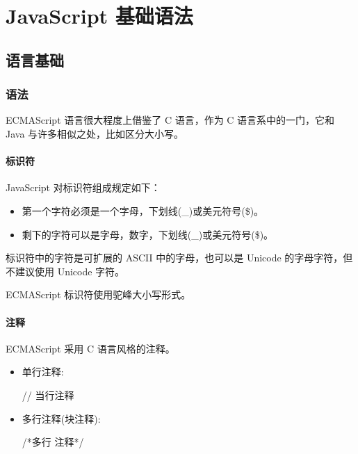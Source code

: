 \chapter{JavaScript 基础语法}
\section{语言基础}
\subsection{语法}

ECMAScript 语言很大程度上借鉴了 C 语言，作为 C 语言系中的一门，它和 Java 与许多相似之处，比如区分大小写。

\subsubsection{标识符}

JavaScript 对标识符组成规定如下：
\begin{itemize}
    \item 第一个字符必须是一个字母，下划线(\_)或美元符号(\$)。
    \item 剩下的字符可以是字母，数字，下划线(\_)或美元符号(\$)。
\end{itemize}

标识符中的字符是可扩展的 ASCII 中的字母，也可以是 Unicode 的字母字符，但不建议使用 Unicode 字符。


ECMAScript 标识符使用驼峰大小写形式。

\subsubsection{注释}
ECMAScript 采用 C 语言风格的注释。
\begin{itemize}
    \item 单行注释:
    
    \begin{JavaScript}
    // 当行注释
    \end{JavaScript}
    \item 多行注释(块注释):
    \begin{JavaScript}
    /*多行
    注释*/
    \end{JavaScript}
\end{itemize}

